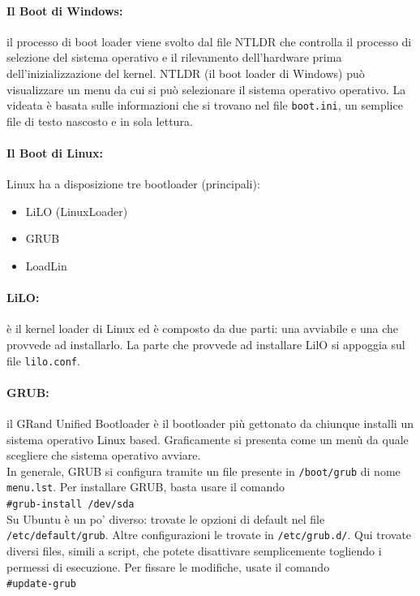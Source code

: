\documentclass[a4paper]{report}
\newcommand\tab[1][1cm]{\hspace*{#1}}
\begin{document}
\paragraph{Il Boot di Windows:} il processo di boot loader viene svolto dal file NTLDR che
controlla il processo di selezione del sistema operativo e il
rilevamento dell'hardware prima dell'inizializzazione del kernel. NTLDR (il boot loader di Windows) può visualizzare un menu da cui si può
selezionare il sistema operativo operativo. La videata è
basata sulle informazioni che si trovano nel file \texttt{boot.ini}, un semplice file di testo nascosto e in sola lettura.\\
\paragraph{Il Boot di Linux:} Linux ha a disposizione tre bootloader (principali):
\begin{itemize}
\item LiLO (LinuxLoader)
\item GRUB
\item LoadLin
\end{itemize}
\paragraph{LiLO:} è il kernel loader di Linux
ed è composto da due parti: una avviabile e
una che provvede ad installarlo. La parte che
provvede ad installare LilO si appoggia sul file
\texttt{lilo.conf}.
\paragraph{GRUB:} il GRand Unified Bootloader è il bootloader più gettonato da chiunque installi un sistema operativo Linux based. Graficamente si presenta come un menù da quale scegliere che sistema operativo avviare. \\
In generale, GRUB si configura tramite un file presente in \texttt{/boot/grub} di nome \texttt{menu.lst}. Per installare GRUB, basta usare il comando \\
\tab\texttt{\#grub-install /dev/sda}\\
Su Ubuntu è un po' diverso: trovate le opzioni di default nel file \texttt{/etc/default/grub}. Altre configurazioni le trovate in \texttt{/etc/grub.d/}. Qui trovate diversi files, simili a script, che potete disattivare semplicemente togliendo i permessi di esecuzione. Per fissare le modifiche, usate il comando\\
\tab\texttt{\#update-grub}\\
\end{document}
